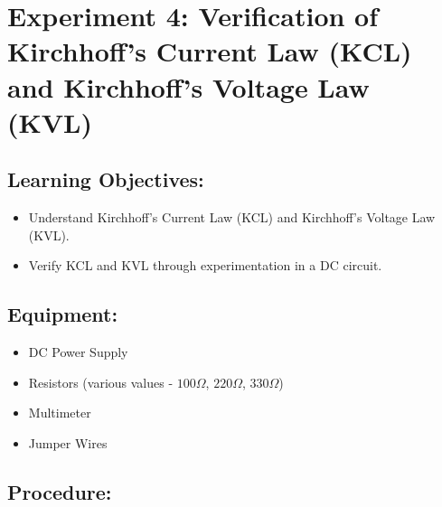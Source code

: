 \section*{Experiment 4: Verification of Kirchhoff's Current Law (KCL) and Kirchhoff's Voltage Law (KVL)}  

\subsection*{Learning Objectives:}
\begin{itemize}
    \item Understand Kirchhoff's Current Law (KCL) and Kirchhoff's Voltage Law (KVL).
    \item Verify KCL and KVL through experimentation in a DC circuit.
\end{itemize}

\subsection*{Equipment:}
\begin{itemize}
    \item DC Power Supply
    \item Resistors (various values - $100 \Omega$, $220 \Omega$, $330\Omega$)
    \item Multimeter
    \item Jumper Wires
\end{itemize}

\subsection*{Procedure:}

